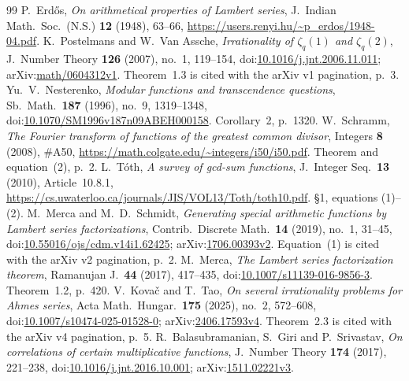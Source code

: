 \documentclass[11pt]{article}
\theoremstyle{plain}
\theoremstyle{definition}
\theoremstyle{remark}
\begin{document}
\begin{thebibliography}{99}
P.~Erd\H{o}s, \emph{On arithmetical properties of Lambert series},
J.\ Indian Math.\ Soc.\ (N.S.) \textbf{12} (1948), 63--66,
\url{https://users.renyi.hu/~p_erdos/1948-04.pdf}.
K.~Postelmans and W.~Van Assche, \emph{Irrationality of $\zeta_q(1)$ and
$\zeta_q(2)$}, J.\ Number Theory \textbf{126} (2007), no.~1, 119--154,
doi:\href{https://doi.org/10.1016/j.jnt.2006.11.011}{10.1016/j.jnt.2006.11.011};
arXiv:\href{https://arxiv.org/abs/math/0604312v1}{math/0604312v1}.
Theorem~1.3 is cited with the arXiv v1 pagination, p.~3.
Yu.~V.~Nesterenko, \emph{Modular functions and transcendence questions},
Sb.\ Math.\ \textbf{187} (1996), no.~9, 1319--1348,
doi:\href{https://doi.org/10.1070/SM1996v187n09ABEH000158}{10.1070/SM1996v187n09ABEH000158}.
Corollary~2, p.~1320.
W.~Schramm, \emph{The Fourier transform of functions of the greatest common
divisor}, Integers \textbf{8} (2008), \#A50,
\url{https://math.colgate.edu/~integers/i50/i50.pdf}.
Theorem and equation~(2), p.~2.
L.~T\'oth, \emph{A survey of gcd-sum functions}, J.\ Integer Seq.\ \textbf{13}
(2010), Article~10.8.1,
\url{https://cs.uwaterloo.ca/journals/JIS/VOL13/Toth/toth10.pdf}.
\S1, equations (1)--(2).
M.~Merca and M.~D.~Schmidt, \emph{Generating special arithmetic functions by
Lambert series factorizations}, Contrib.\ Discrete Math.\ \textbf{14} (2019),
no.~1, 31--45,
doi:\href{https://doi.org/10.55016/ojs/cdm.v14i1.62425}{10.55016/ojs/cdm.v14i1.62425};
arXiv:\href{https://arxiv.org/abs/1706.00393v2}{1706.00393v2}.
Equation~(1) is cited with the arXiv v2 pagination, p.~2.
M.~Merca, \emph{The Lambert series factorization theorem},
Ramanujan J.\ \textbf{44} (2017), 417--435,
doi:\href{https://doi.org/10.1007/s11139-016-9856-3}{10.1007/s11139-016-9856-3}.
Theorem~1.2, p.~420.
V.~Kova\v{c} and T.~Tao, \emph{On several irrationality problems for Ahmes
series}, Acta Math.\ Hungar.\ \textbf{175} (2025), no.~2, 572--608,
doi:\href{https://doi.org/10.1007/s10474-025-01528-0}{10.1007/s10474-025-01528-0};
arXiv:\href{https://arxiv.org/abs/2406.17593v4}{2406.17593v4}.
Theorem~2.3 is cited with the arXiv v4 pagination, p.~5.
R.~Balasubramanian, S.~Giri and P.~Srivastav, \emph{On correlations of certain
multiplicative functions}, J.\ Number Theory \textbf{174} (2017), 221--238,
doi:\href{https://doi.org/10.1016/j.jnt.2016.10.001}{10.1016/j.jnt.2016.10.001};
arXiv:\href{https://arxiv.org/abs/1511.02221v3}{1511.02221v3}.

\end{thebibliography}
\end{document}
